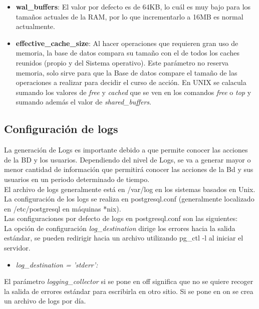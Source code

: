 \begin{itemize}
\item \textbf{wal\_buffers}: El valor por defecto es de 64KB, lo cuál es muy bajo para los tamaños actuales de la RAM, por lo que incrementarlo a 16MB es normal actualmente.

\item \textbf{effective\_cache\_size}: Al hacer operaciones que requieren gran uso de memoria, la base de datos compara su tamaño con el de todos los caches reunidos (propio y del Sistema operativo). Este parámetro no reserva memoria, solo sirve para que la Base de datos compare el tamaño de las operaciones a realizar para decidir el curso de acción. En UNIX se calacula sumando los valores de \textit{free} y \textit{cached} que se ven en los comandos \textit{free} o \textit{top} y sumando además el valor de  \textit{shared\_buffers}.

\end{itemize}

\subsection{Configuración de logs}

La generación de Logs es importante debido a que permite conocer las acciones de la BD y los usuarios. Dependiendo del nivel de Logs, se va a generar mayor o menor cantidad de información que permitirá conocer las acciones de la Bd y sus usuarios en un periodo determinado de tiempo.\\

El archivo de logs generalmente está en /var/log en los sistemas basados en Unix.\\

La configuración de los logs se realiza en postgresql.conf (generalmente localizado en /etc/postgresql en máquinas *nix).\\

Las configuraciones por defecto de logs en postgresql.conf son las siguientes:\\

La opción de configuración \emph{log\_destination} dirige los errores hacia la salida estándar, se pueden redirigir hacia un archivo utilizando pg\_ctl -l al iniciar el servidor.

\begin{itemize}
\item \emph{log\_destination = 'stderr':}
\end{itemize}

El parámetro \emph{logging\_collector} si se pone en off significa que no se quiere recoger la salida de errores estándar para escribirla en otro sitio. Si se pone en on se crea un archivo de logs por día.

